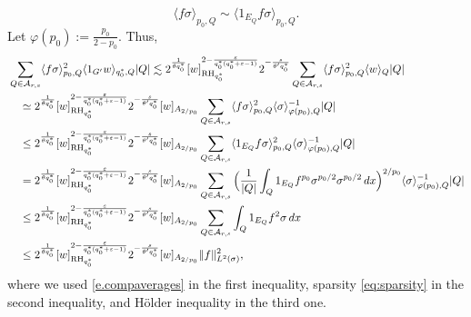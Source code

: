 \documentclass[11pt,reqno]{amsart}
\theoremstyle{plain} %
\newcommand{\1}{ \mathbbm{1}}   %
\theoremstyle{definition}
\theoremstyle{remark}
\numberwithin{equation}{section}
\begin{document}
\begin{equation}
\label{eq:sparsity}
\langle f \sigma  \rangle_{p_0, Q}\sim \langle1_{E_Q} f \sigma  \rangle_{p_0,Q}.
\end{equation}
Let $\varphi(p_0):= \frac{p_0}{2-p_0}$. Thus, 
\begin{align} \label{estimate2ni}
\notag&\sum_{Q\in\mathcal A_{r,s}} \langle f \sigma \rangle_{p_0, Q}^2  \langle 1_{G'} w \rangle_{q_0^*, Q}|Q|\lesssim 2^{\frac{1}{\theta q_0^*}} [w]_{\operatorname{RH}_{q_0^*}}^{2-\frac{\varepsilon}{q_0^*(q_0^*+\varepsilon-1)}}2^{-\frac{s}{\theta'q_0^*}}\sum_{Q\in\mathcal A_{r,s}} \langle f \sigma \rangle_{p_0, Q}^2 \langle w \rangle_Q |Q|\\
 \notag&\quad\simeq 2^{\frac{1}{\theta q_0^*}} [w]_{\operatorname{RH}_{q_0^*}}^{2-\frac{\varepsilon}{q_0^*(q_0^*+\varepsilon-1)}}2^{-\frac{s}{\theta'q_0^*}}[w]_{A_{2/p_0}}\sum_{Q\in\mathcal A_{r,s}} \langle f\sigma  \rangle_{p_0, Q}^2  \langle \sigma \rangle_{\varphi(p_0), Q}^{-1}|Q|\\
\notag&\quad\leq 2^{\frac{1}{\theta q_0^*}} [w]_{\operatorname{RH}_{q_0^*}}^{2-\frac{\varepsilon}{q_0^*(q_0^*+\varepsilon-1)}}2^{-\frac{s}{\theta'q_0^*}} [w]_{A_{2/p_0}} \sum_{Q\in\mathcal A_{r,s}} \langle1_{E_Q} f \sigma  \rangle_{p_0,Q}^2 \langle \sigma \rangle_{\varphi(p_0), Q}^{-1}|Q|\\
\notag&\quad =  2^{\frac{1}{\theta q_0^*}} [w]_{\operatorname{RH}_{q_0^*}}^{2-\frac{\varepsilon}{q_0^*(q_0^*+\varepsilon-1)}}2^{-\frac{s}{\theta'q_0^*}}[w]_{A_{2/p_0}} \sum_{Q\in\mathcal A_{r,s}} \Big(\frac{1}{|Q|}\int_Q1_{E_Q}f^{p_0} \sigma^{p_0/2} \sigma^{p_0/2}\,dx\Big)^{2/p_0} \langle \sigma \rangle_{\varphi(p_0), Q}^{-1}|Q|\\
 \notag&\quad\leq 2^{\frac{1}{\theta q_0^*}} [w]_{\operatorname{RH}_{q_0^*}}^{2-\frac{\varepsilon}{q_0^*(q_0^*+\varepsilon-1)}}2^{-\frac{s}{\theta'q_0^*}}[w]_{A_{2/p_0}}  \sum_{Q\in\mathcal A_{r,s}}\int_Q 1_{E_Q}f^{2} \sigma\,dx\\
&\quad \leq  2^{\frac{1}{\theta q_0^*}} [w]_{\operatorname{RH}_{q_0^*}}^{2-\frac{\varepsilon}{q_0^*(q_0^*+\varepsilon-1)}}2^{-\frac{s}{\theta'q_0^*}}[w]_{A_{2/p_0}} \|f\|_{L^{2}(\sigma)}^{2},
\end{align}
where we used \eqref{e.compaverages} in the first inequality, sparsity \eqref{eq:sparsity} in the second inequality, and H\"older inequality in the third one.
\end{document}
